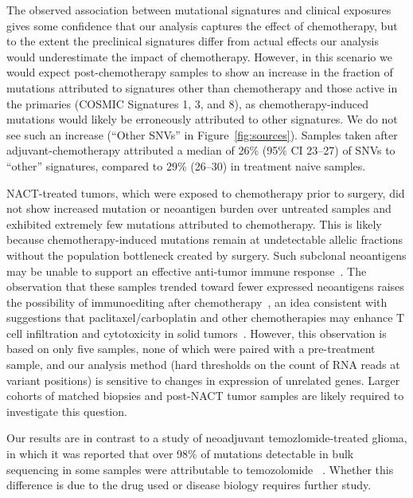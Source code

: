 The observed association between mutational signatures and clinical exposures gives some confidence that our analysis captures the effect of chemotherapy, but to the extent the preclinical signatures differ from actual effects our analysis would underestimate the impact of chemotherapy. However, in this scenario we would expect post-chemotherapy samples to show an increase in the fraction of mutations attributed to signatures other than chemotherapy and those active in the primaries (COSMIC Signatures 1, 3, and 8), as chemotherapy-induced mutations would likely be erroneously attributed to other signatures. We do not see such an increase (``Other SNVs'' in Figure~\ref{fig:sources}). Samples taken after adjuvant-chemotherapy attributed a median of 26\% (95\% CI 23--27) of SNVs to ``other'' signatures, compared to 29\% (26--30) in treatment naive samples.

NACT-treated tumors, which were exposed to chemotherapy prior to surgery, did not show increased mutation or neoantigen burden over untreated samples and exhibited extremely few mutations attributed to chemotherapy. This is likely because chemotherapy-induced mutations remain at undetectable allelic fractions without the population bottleneck created by surgery. Such subclonal neoantigens may be unable to support an effective anti-tumor immune response~\cite{McGranahan_2016}. The observation that these samples trended toward fewer expressed neoantigens raises the possibility of immunoediting after chemotherapy~\cite{Dunn_2002}, an idea consistent with suggestions that paclitaxel/carboplatin and other chemotherapies may enhance T cell infiltration and cytotoxicity in solid tumors~\cite{Demaria2001,Wu_2009,Pfannenstiel_2010,Hodge_2013}. However, this observation is based on only five samples, none of which were paired with a pre-treatment sample, and our analysis method (hard thresholds on the count of RNA reads at variant positions) is sensitive to changes in expression of unrelated genes. Larger cohorts of matched biopsies and post-NACT tumor samples are likely required to investigate this question.

Our results are in contrast to a study of neoadjuvant temozlomide-treated glioma, in which it was reported that over 98\% of mutations detectable in bulk sequencing in some samples were attributable to temozolomide ~\cite{Johnson_2013}. Whether this difference is due to the drug used or disease biology requires further study.


